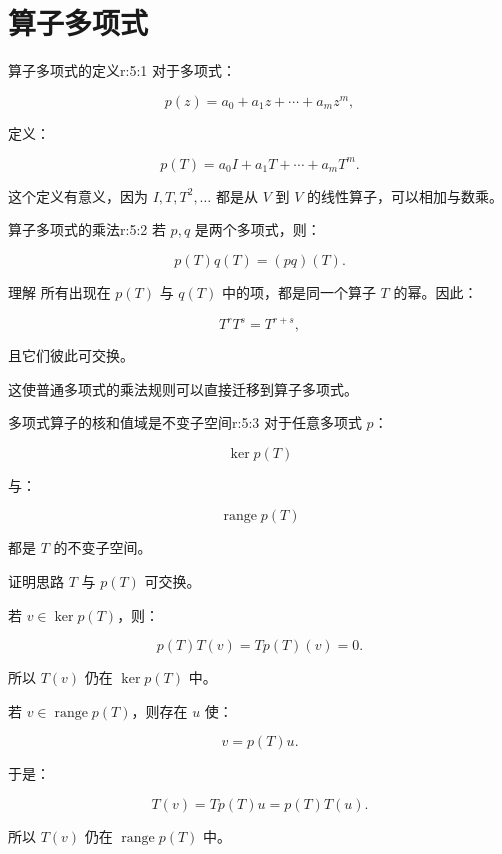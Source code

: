 
\chapter{算子多项式}


\begin{jdefn}{算子多项式的定义}{r:5:1}
对于多项式：

\[
p(z)=a_0+a_1z+\cdots+a_mz^m,
\]

定义：

\[
p(T)
=
a_0I+a_1T+\cdots+a_mT^m.
\]

这个定义有意义，因为 $I,T,T^2,\ldots$ 都是从 $V$ 到 $V$ 的线性算子，可以相加与数乘。
\end{jdefn}

\begin{jprop}{算子多项式的乘法}{r:5:2}
若 $p,q$ 是两个多项式，则：

\[
p(T)q(T)=(pq)(T).
\]
\end{jprop}

\begin{jidea}{理解}
所有出现在 $p(T)$ 与 $q(T)$ 中的项，都是同一个算子 $T$ 的幂。因此：

\[
T^rT^s=T^{r+s},
\]

且它们彼此可交换。

这使普通多项式的乘法规则可以直接迁移到算子多项式。
\end{jidea}

\begin{jprop}{多项式算子的核和值域是不变子空间}{r:5:3}
对于任意多项式 $p$：

\[
\ker p(T)
\]

与：

\[
\operatorname{range}p(T)
\]

都是 $T$ 的不变子空间。
\end{jprop}

\begin{jproof}{证明思路}
$T$ 与 $p(T)$ 可交换。

若 $v\in\ker p(T)$，则：

\[
p(T)T(v)=T p(T)(v)=0.
\]

所以 $T(v)$ 仍在 $\ker p(T)$ 中。

若 $v\in\operatorname{range}p(T)$，则存在 $u$ 使：

\[
v=p(T)u.
\]

于是：

\[
T(v)=Tp(T)u=p(T)T(u).
\]

所以 $T(v)$ 仍在 $\operatorname{range}p(T)$ 中。
\end{jproof}
